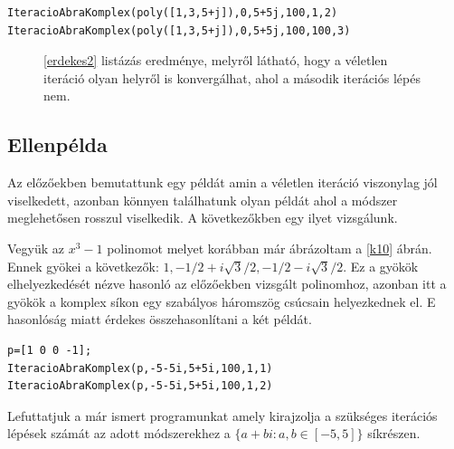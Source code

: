 \documentclass[a4paper,12pt]{report}
\begin{document}
                \begin{lstlisting}[caption=Bemenet,label=erdekes2]
IteracioAbraKomplex(poly([1,3,5+j]),0,5+5j,100,1,2)
IteracioAbraKomplex(poly([1,3,5+j]),0,5+5j,100,100,3)
				\end{lstlisting}
                
                \begin{figure}[hpp]
					\centering
			        \caption{\ref{erdekes2} listázás eredménye, melyről látható, hogy a véletlen iteráció olyan helyről is konvergálhat, ahol a második iterációs lépés nem.}
				\end{figure}
                
                

			\subsection{Ellenpélda}
                Az előzőekben bemutattunk egy példát amin a véletlen iteráció viszonylag jól viselkedett, azonban könnyen találhatunk olyan példát ahol a módszer meglehetősen rosszul viselkedik. A következőkben egy ilyet vizsgálunk.
                
                Vegyük az $x^3-1$ polinomot melyet korábban már ábrázoltam a \ref{k10} ábrán. Ennek gyökei a következők: $1, -1/2+i\sqrt{3}/2, -1/2-i\sqrt{3}/2$. Ez a gyökök elhelyezkedését nézve hasonló az előzőekben vizsgált polinomhoz, azonban itt a gyökök a komplex síkon egy szabályos háromszög csúcsain helyezkednek el. E hasonlóság miatt érdekes összehasonlítani a két példát.
                \begin{lstlisting}[caption=Bemenet,label=str:ellen1]
p=[1 0 0 -1];
IteracioAbraKomplex(p,-5-5i,5+5i,100,1,1)
IteracioAbraKomplex(p,-5-5i,5+5i,100,1,2)
                \end{lstlisting}
                Lefuttatjuk a már ismert programunkat amely kirajzolja a szükséges iterációs lépések számát az adott módszerekhez a $\{a+bi:a,b\in[-5,5]\}$ síkrészen.
                
\end{document}
